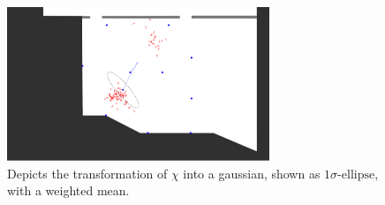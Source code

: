 \begin{figure}
	\includegraphics[width=0.7\textwidth]{figures/sigellipse}
	\caption{Depicts the transformation of $\chi$ into a gaussian, shown as $1\sigma\text{-ellipse}$, with a weighted mean.}
	\label{fig:algo_sigellipse}
\end{figure}

